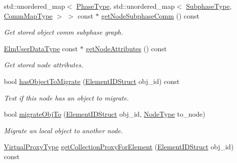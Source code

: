 \begin{DoxyCompactItemize}
std\+::unordered\+\_\+map$<$ \hyperlink{namespacevt_a46ce6733d5cdbd735d561b7b4029f6d7}{Phase\+Type}, std\+::unordered\+\_\+map$<$ \hyperlink{namespacevt_ae78cbfdf1e57470e33eedb074f2beeba}{Subphase\+Type}, \hyperlink{namespacevt_1_1vrt_1_1collection_1_1balance_a01ee1fb0ae2da1d2ab7fdca3be9ae351}{Comm\+Map\+Type} $>$ $>$ const  $\ast$ \hyperlink{structvt_1_1vrt_1_1collection_1_1balance_1_1_node_l_b_data_a783e8620fff1016d7073a3747379127f}{get\+Node\+Subphase\+Comm} () const
\begin{DoxyCompactList}\small\item\em Get stored object comm subphase graph. \end{DoxyCompactList}\item 
\hyperlink{namespacevt_1_1vrt_1_1collection_1_1balance_abf9eea0f4c24e41036ab844025e7d4c8}{Elm\+User\+Data\+Type} const  $\ast$ \hyperlink{structvt_1_1vrt_1_1collection_1_1balance_1_1_node_l_b_data_a567dfeef1d927e928f492ae6e744bc62}{get\+Node\+Attributes} () const
\begin{DoxyCompactList}\small\item\em Get stored node attributes. \end{DoxyCompactList}\item 
bool \hyperlink{structvt_1_1vrt_1_1collection_1_1balance_1_1_node_l_b_data_af025247a42d9b3ff6ba476714aad42fa}{has\+Object\+To\+Migrate} (\hyperlink{namespacevt_1_1vrt_1_1collection_1_1balance_a9f5b53fafb270212279a4757d2c4cd28}{Element\+I\+D\+Struct} obj\+\_\+id) const
\begin{DoxyCompactList}\small\item\em Test if this node has an object to migrate. \end{DoxyCompactList}\item 
bool \hyperlink{structvt_1_1vrt_1_1collection_1_1balance_1_1_node_l_b_data_a66619f696c49ce53d005f4b9ebbf12a2}{migrate\+Obj\+To} (\hyperlink{namespacevt_1_1vrt_1_1collection_1_1balance_a9f5b53fafb270212279a4757d2c4cd28}{Element\+I\+D\+Struct} obj\+\_\+id, \hyperlink{namespacevt_a866da9d0efc19c0a1ce79e9e492f47e2}{Node\+Type} to\+\_\+node)
\begin{DoxyCompactList}\small\item\em Migrate an local object to another node. \end{DoxyCompactList}\item 
\hyperlink{namespacevt_a1b417dd5d684f045bb58a0ede70045ac}{Virtual\+Proxy\+Type} \hyperlink{structvt_1_1vrt_1_1collection_1_1balance_1_1_node_l_b_data_a7f815606907a31f74428f058c220bf54}{get\+Collection\+Proxy\+For\+Element} (\hyperlink{namespacevt_1_1vrt_1_1collection_1_1balance_a9f5b53fafb270212279a4757d2c4cd28}{Element\+I\+D\+Struct} obj\+\_\+id) const

\end{DoxyCompactItemize}
